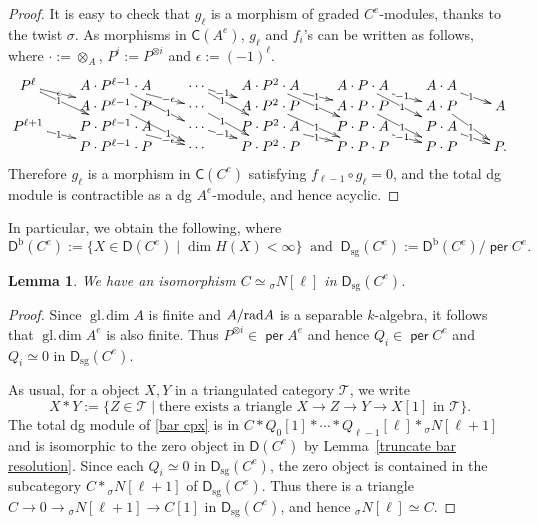 \documentclass[a4paper,reqno,11pt]{amsart}
\newtheorem{lemma}[theorem]{Lemma}
\theoremstyle{definition}
\newcommand{\CCC}{\mathsf{C}}
\newcommand{\DDD}{\mathsf{D}}
\newcommand{\TT}{\mathcal{T}}
\newcommand{\bo}{\operatorname{b}\nolimits}
\newcommand{\gl}{\operatorname{gl.\!dim}\nolimits}
\newcommand{\sg}{\operatorname{sg}\nolimits}
\DeclareMathOperator{\per}{\mathsf{per}}
\numberwithin{equation}{section}
\begin{document}
\begin{proof}
It is easy to check that $g_\ell$ is a morphism of graded $C^e$-modules, thanks to the twist $\sigma$. As morphisms in $\CCC(A^e)$, $g_\ell$ and $f_i$'s can be written as follows, where $\cdot:=\otimes_A$, $P^i:=P^{\otimes i}$ and $\epsilon:=(-1)^\ell$.
\[\xymatrix@R0em@C2em{
P^\ell\ar[dr]|(.35){\epsilon}\ar[ddr]|(.35)1&A\cdot P^{\ell-1}\cdot A\ar[dr]|(.65){-\epsilon}\ar[ddr]|(.65)1&\cdots\ar[dr]|(.35){-1}\ar[ddr]|(.35)1&A\cdot P^2\cdot A\ar[dr]|{1}\ar[ddr]|1&A\cdot P\cdot A\ar[dr]|{-1}\ar[ddr]|1&A\cdot A\ar[dr]|1\\
&A\cdot P^{\ell-1}\cdot P\ar[ddr]|(.65)1&\cdots\ar[ddr]|(.35)1&A\cdot P^2\cdot P\ar[ddr]|1&A\cdot P\cdot P\ar[ddr]|1&A\cdot P\ar[ddr]|1&A\\
P^{\ell+1}\ar[dr]|(.35)1&P\cdot P^{\ell-1}\cdot A\ar[dr]|(.65){-\epsilon}&\cdots\ar[dr]|(.35){-1}&P\cdot P^2\cdot A\ar[dr]|1&P\cdot P\cdot A\ar[dr]|{-1}&P\cdot A\ar[dr]|1\\
&P\cdot P^{\ell-1}\cdot P&\cdots&P\cdot P^2\cdot P&P\cdot P\cdot P&P\cdot P&P.}\] 
%
Therefore $g_\ell$ is a morphism in $\CCC(C^e)$ satisfying $f_{\ell-1}\circ g_\ell=0$, and the total dg module is contractible as a dg $A^e$-module, and hence acyclic.
\end{proof}

In particular, we obtain the following, where
\[\DDD^{\bo}(C^e):=\{X\in\DDD(C^e)\mid\dim H(X)<\infty\}\ \mbox{ and }\ \DDD_{\sg}(C^e):=\DDD^{\bo}(C^e)/\per C^e.\]

\begin{lemma}\label{C and N}
We have an isomorphism $C\simeq {}_\sigma N[\ell]$ in $\DDD_{\sg}(C^e)$.
\end{lemma}

\begin{proof}
Since $\gl A$ is finite and $A/{\rm rad} A$ is a separable $k$-algebra, it follows that $\gl A^e$ is also finite. Thus $P^{\otimes i}\in\per A^e$ and hence $Q_i\in\per C^e$ and $Q_i\simeq 0$ in $\DDD_{\sg}(C^e)$.

As usual, for a object $X,Y$ in a triangulated category $\TT$, we write
\[X*Y:=\{Z\in\TT\mid \mbox{there exists a triangle $X\to Z\to Y\to X[1]$ in $\TT$}\}.\]
The total dg module of \eqref{bar cpx} is in $C*Q_0[1]*\cdots*Q_{\ell-1}[\ell]*{}_\sigma N[\ell+1]$ and is isomorphic to the zero object in $\DDD(C^e)$ by Lemma~\ref{truncate bar resolution}.
Since each $Q_i\simeq 0$ in $\DDD_{\sg}(C^e)$, the zero object is contained in the subcategory $C*{}_\sigma N[\ell+1]$ of $\DDD_{\sg}(C^e)$. Thus there is a triangle $C\to 0\to{}_\sigma N[\ell+1]\to C[1]$ in $\DDD_{\sg}(C^e)$, and hence ${}_\sigma N[\ell]\simeq C$.
\end{proof}
\end{document}
